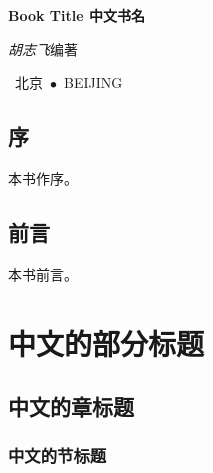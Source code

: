 \documentclass[a4paper,twoside]{ctexbook}
\begin{document}
\begin{titlepage}
  \centering
  \vspace*{25ex}
  { \textbf{Book Title 中文书名} \par}
  \vspace{10ex}
  { \textit{胡志飞}\quad{}编著 \par}
  \vfill
  {\ 北京\ $\bullet$\ BEIJING}
\end{titlepage}
\thispagestyle{empty}


\frontmatter

\chapter*{序}

本书作序。



\chapter*{前言}

本书前言。


{
  \hypersetup{hidelinks}
  \tableofcontents
}



\mainmatter


\part{中文的部分标题}

\chapter{中文的章标题}

\hspace{.15\linewidth}\begin{minipage}[H]{.7\linewidth}
{
  \hypersetup{hidelinks}
  \startcontents[chapters]
}
\end{minipage}
\vspace{10ex}

\lipsum[3]

\clearpage

\section{中文的节标题}
\end{document}
